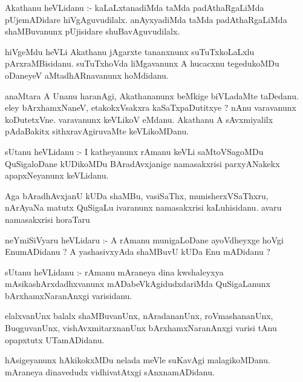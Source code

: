 \documentclass{article}
\begin{document}
\begin{mn}
Akathanu  heVLidanu :- kaLaLxtanadiMda  taMda  padAthaRgaLiMda  pUjemADidare  hiVgAguvudilalx.  anAyxyadiMda  taMda  
padAthaRgaLiMda  shaMBuvanunx  pUjisidare  shuBavAguvudilalx.
\end{mn}

\begin{mn}
hiVgeMdu  heVLi  Akathanu  jAgarxte  tananxnunx  suTuTxkoLaLxlu  pArxraMBisidanu.  suTuTxhoVda  liMgavanunx  A  hucacxnu  
tegedukoMDu  oDaneyeV  aMtadhARnavanunx  hoMdidanu.
\end{mn}

\begin{mn}
anaMtara  A  Unanu  haranAgi,  Akathananunx  beMkige  biVLadaMte  taDedanu.  eley  bArxhamxNaneV,  etakokxVsakxra  kaSaTxpaDutitxye ?  
nAnu  varavanunx  koDutetxVne.  varavanunx  keVLikoV  eMdanu.  Akathanu  A  sAvxmiyalilx  pAdaBakitx  sithxravAgiruvaMte  keVLikoMDanu.
\end{mn}

\begin{mn}
sUtanu  heVLidanu :- I  katheyanunx  rAmanu  keVLi  saMtoVSagoMDu  QuSigaloDane  kUDikoMDu  BAradAvxjanige  namasakxrisi  
parxyANakekx  apapxNeyanunx  keVLidanu.
\end{mn}

\begin{mn}
Aga  bAradhAvxjanU  kUDa  shaMBu,  vasiSaThx, munisherxVSaThxru,  nArAyaNa  matutx  QuSigaLu  ivaranunx  namasakxrisi  kaLuhisidanu.  
avaru  namasakxrisi  horaTaru
\end{mn}

\begin{mn}
neYmiSiVyaru  heVLidaru :- A  rAmanu  munigaLoDane  ayoVdheyxge  hoVgi  EnumADidanu ?  A  yashasivxyAda  shaMBuvU  kUDa  Enu  mADidanu ?
\end{mn}

\begin{mn}
sUtanu  heVLidanu :- rAmanu  mAraneya  dina  kwshaleyxya  mAsikashArxdadhxvanunx  mADabeVkAgidudxdariMda  QuSigaLanunx  
bArxhamxNaranAnxgi  varisidanu.
\end{mn}

\begin{mn}
elalxvanUnx  balalx  shaMBuvanUnx,  nAradananUnx,  roVmashananUnx,  BuqguvanUnx,  vishAvxmitarxnanUnx  bArxhamxNaranAnxgi  
varisi  tAnu  opapxtutx  UTamADidanu.
\end{mn}

\begin{mn}
hAsigeyanunx  hAkikokxMDu  nelada  meVle  suKavAgi  malagikoMDanu.  mAraneya  dinavedudx  vidhivatAtxgi  sAnxnamADidanu.
\end{mn}
\end{document}
